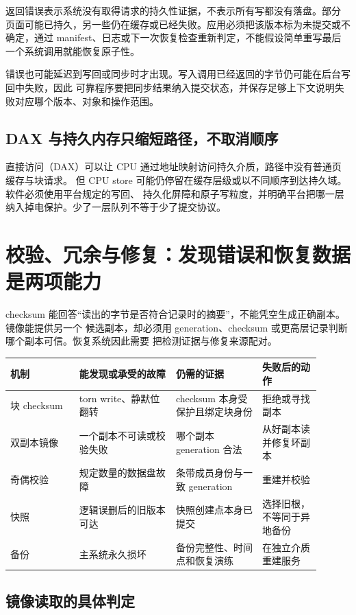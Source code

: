  返回错误表示系统没有取得请求的持久性证据，不表示所有写都没有落盘。部分
页面可能已持久，另一些仍在缓存或已经失败。应用必须把该版本标为未提交或不确定，通过
manifest、日志或下一次恢复检查重新判定，不能假设简单重写最后一个系统调用就能恢复原子性。

错误也可能延迟到写回或同步时才出现。写入调用已经返回的字节仍可能在后台写回中失败，因此
可靠程序要把同步结果纳入提交状态，并保存足够上下文说明失败对应哪个版本、对象和操作范围。

\subsection{DAX 与持久内存只缩短路径，不取消顺序}

直接访问（DAX）可以让 CPU 通过地址映射访问持久介质，路径中没有普通页缓存与块请求。
但 CPU store 可能仍停留在缓存层级或以不同顺序到达持久域。软件必须使用平台规定的写回、
持久化屏障和原子写粒度，并明确平台把哪一层纳入掉电保护。少了一层队列不等于少了提交协议。

\section{校验、冗余与修复：发现错误和恢复数据是两项能力}

checksum 能回答“读出的字节是否符合记录时的摘要”，不能凭空生成正确副本。镜像能提供另一个
候选副本，却必须用 generation、checksum 或更高层记录判断哪个副本可信。恢复系统因此需要
把检测证据与修复来源配对。

\begin{longtable}{|L{0.2\linewidth}|L{0.28\linewidth}|L{0.25\linewidth}|L{0.17\linewidth}|}
\hline
机制 & 能发现或承受的故障 & 仍需的证据 & 失败后的动作 \\ \hline
块 checksum & torn write、静默位翻转 & checksum 本身受保护且绑定块身份 & 拒绝或寻找副本 \\\tablerowrule
双副本镜像 & 一个副本不可读或校验失败 & 哪个副本 generation 合法 & 从好副本读并修复坏副本 \\\tablerowrule
奇偶校验 & 规定数量的数据盘故障 & 条带成员身份与一致 generation & 重建并校验 \\\tablerowrule
快照 & 逻辑误删后的旧版本可达 & 快照创建点本身已提交 & 选择旧根，不等同于异地备份 \\\tablerowrule
备份 & 主系统永久损坏 & 备份完整性、时间点和恢复演练 & 在独立介质重建服务 \\
\hline
\end{longtable}

\subsection{镜像读取的具体判定}

